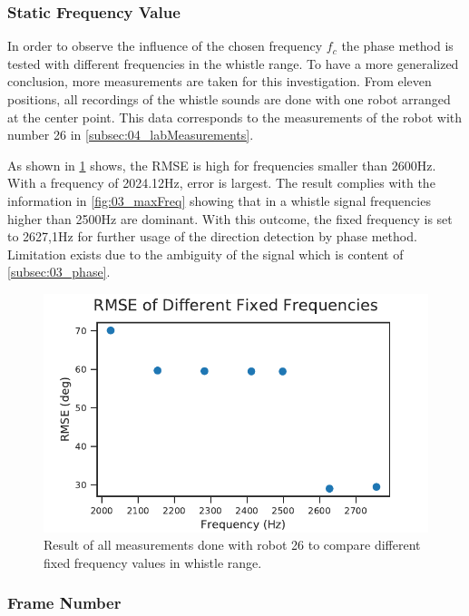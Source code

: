 \subsubsection*{Static Frequency Value}
\label{subsubsec:04_fixedFrequencyVal}

In order to observe the influence of the chosen frequency $f_c$
the phase method is tested with different frequencies in the whistle range.
To have a more generalized conclusion, more measurements are taken for this
investigation.
From eleven positions, all recordings of the whistle sounds are done
with one robot arranged at the center point.
This data corresponds to the measurements of the robot with number 26
in \cref{subsec:04_labMeasurements}.

As shown in \cref{fig:04_diffFc} shows, the \ac{RMSE} is high for
frequencies smaller than 2600\si{\hertz}.
With a frequency of 2024.12\si{\hertz}, error is largest.
The result complies with the information in \cref{fig:03_maxFreq} showing that
in a whistle signal frequencies higher than 2500\si{\hertz} are dominant.
With this outcome, the fixed frequency is set to 2627,1\si{\hertz}
for further usage of the direction detection by phase method.
Limitation exists due to the ambiguity of the signal which is
content of \cref{subsec:03_phase}.
\begin{figure}[ht]
	\centering
		\includegraphics[]{figures/evaluation/phase_fc_rmse}
	\caption{Result of all measurements done with robot 26 to compare different
	fixed frequency values in whistle range.}
	\label{fig:04_diffFc}
\end{figure}
\subsubsection*{Frame Number}
\label{subsubsec:04_frameNumber}

